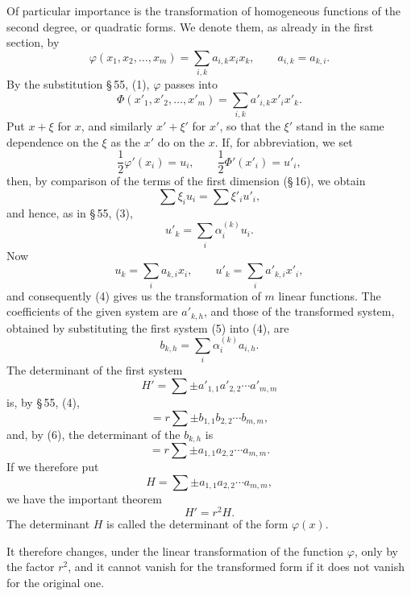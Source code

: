 \documentclass[11pt]{article}
\begin{document}
Of particular importance is the transformation of homogeneous functions of the second degree, or quadratic forms. We denote them, as already in the first section, by
\begin{equation}
 \varphi(x_1,x_2,\ldots,x_m)=\sum_{i,k}a_{i,k}x_i x_k,
 \qquad a_{i,k}=a_{k,i}.
\tag{1}
\end{equation}
By the substitution \S\,55, (1), $\varphi$ passes into
\begin{equation}
 \Phi(x'_1,x'_2,\ldots,x'_m)=\sum_{i,k}a'_{i,k}x'_i x'_k.
\tag{2}
\end{equation}
Put $x+\xi$ for $x$, and similarly $x'+\xi'$ for $x'$, so that the $\xi'$ stand in the same dependence on the $\xi$ as the $x'$ do on the $x$. If, for abbreviation, we set
\[
 \frac12\varphi'(x_i)=u_i,
 \qquad
 \frac12\Phi'(x'_i)=u'_i,
\]
then, by comparison of the terms of the first dimension (\S\,16), we obtain
\begin{equation}
 \sum \xi_i u_i=\sum \xi'_i u'_i,
\tag{3}
\end{equation}
and hence, as in \S\,55, (3),
\begin{equation}
 u'_k=\sum_i \alpha_i^{(k)}u_i.
\tag{4}
\end{equation}
Now
\begin{equation}
 u_k=\sum_i a_{k,i}x_i,
 \qquad
 u'_k=\sum_i a'_{k,i}x'_i,
\tag{5}
\end{equation}
and consequently (4) gives us the transformation of $m$ linear functions. The coefficients of the given system are $a'_{k,h}$, and those of the transformed system, obtained by substituting the first system (5) into (4), are
\begin{equation}
 b_{k,h}=\sum_i \alpha_i^{(k)}a_{i,h}.
\tag{6}
\end{equation}
The determinant of the first system
\[
 H'=\sum \pm a'_{1,1}a'_{2,2}\cdots a'_{m,m}
\]
is, by \S\,55, (4),
\[
 =r\sum\pm b_{1,1}b_{2,2}\cdots b_{m,m},
\]
and, by (6), the determinant of the $b_{k,h}$ is
\[
 =r\sum\pm a_{1,1}a_{2,2}\cdots a_{m,m}.
\]
If we therefore put
\begin{equation}
 H=\sum \pm a_{1,1}a_{2,2}\cdots a_{m,m},
\tag{7}
\end{equation}
we have the important theorem
\begin{equation}
 H'=r^2H.
\tag{8}
\end{equation}
The determinant $H$ is called the determinant of the form $\varphi(x)$.

It therefore changes, under the linear transformation of the function $\varphi$, only by the factor $r^2$, and it cannot vanish for the transformed form if it does not vanish for the original one.
\end{document}
